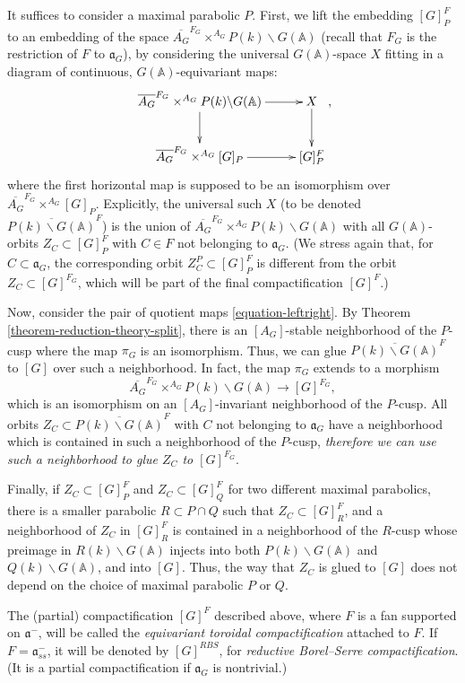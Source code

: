 It suffices to consider a maximal parabolic $P$. 
First, we lift the embedding $[G]_P^{F}$ to an embedding of the space $\overline{A_G}^{F_G} \times^{A_G} P(k)\backslash G(\mathbb A)$ (recall that $F_G$ is the restriction of $F$ to $\mathfrak a_G$), by considering the universal $G(\mathbb A)$-space $X$ fitting in a diagram of continuous, $G(\mathbb A)$-equivariant maps:
$$ \xymatrix{\overline{A_G}^{F_G} \times^{A_G} P(k)\backslash G(\mathbb A) \ar[d] \ar[r] & X \ar[d] \\ \overline{A_G}^{F_G} \times^{A_G} [G]_P \ar[r] & [G]_P^F},$$
where the first horizontal map is supposed to be an isomorphism over $\overline{A_G}^{F_G} \times^{A_G} [G]_P$.
Explicitly, the universal such $X$ (to be denoted $\overline{P(k)\backslash G(\mathbb A)}^F$) is the union of $\overline{A_G}^{F_G} \times^{A_G} P(k)\backslash G(\mathbb A)$ with all $G(\mathbb A)$-orbits $Z_C\subset [G]_P^F$ with $C\in F$ not belonging to $\mathfrak a_G$. (We stress again that, for $C\subset \mathfrak a_G$, the corresponding orbit $Z_C^P\subset [G]_P^F$ is different from the orbit $Z_C \subset [G]^{F_G}$, which will be part of the final compactification $[G]^F$.)

Now, consider the pair of quotient maps \eqref{equation-leftright}. By Theorem \ref{theorem-reduction-theory-split}, there is an $[A_G]$-stable neighborhood of the $P$-cusp where the map $\pi_G$ is an isomorphism. Thus, we can glue $\overline{P(k)\backslash G(\mathbb A)}^F$ to $[G]$ over such a neighborhood. In fact, the map $\pi_G$ extends to a morphism 
$$ \overline{A_G}^{F_G} \times^{A_G} P(k)\backslash G(\mathbb A) \to [G]^{F_G},$$
which is an isomorphism on an $[A_G]$-invariant neighborhood of the $P$-cusp. All orbits $Z_C\subset \overline{P(k)\backslash G(\mathbb A)}^F$ with $C$ not belonging to $\mathfrak a_G$ have a neighborhood which is contained in such a neighborhood of the $P$-cusp, \emph{therefore we can use such a neighborhood to glue $Z_C$ to $[G]^{F_G}$}. 

Finally, if $Z_C\subset [G]_P^F$ and $Z_C\subset [G]_Q^F$ for two different maximal parabolics, there is a smaller parabolic $R\subset P\cap Q$ such that $Z_C\subset [G]_R^F$, and a neighborhood of $Z_C$ in $[G]_R^F$ is contained in a neighborhood of the $R$-cusp whose preimage in $R(k)\backslash G(\mathbb A)$ injects into both $P(k)\backslash G(\mathbb A)$ and $Q(k)\backslash G(\mathbb A)$, and into $[G]$. Thus, the way that $Z_C$ is glued to $[G]$ does not depend on the choice of maximal parabolic $P$ or $Q$.

\begin{definition}
 \label{definition-equivariant-toroidal-compactification}
The (partial) compactification $[G]^F$ described above, where $F$ is a fan supported on $\mathfrak a^-$, will be called the {\it equivariant toroidal compactification} attached to $F$. If $F=\mathfrak a^-_{ss}$, it will be denoted by $[G]^{RBS}$, for {\it reductive Borel--Serre compactification}. (It is a partial compactification if $\mathfrak a_G$ is nontrivial.)
\end{definition}

